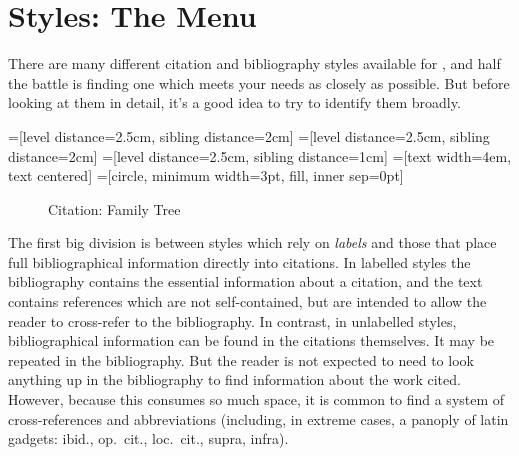 \chapter{Styles: The Menu}\label{ch:bibstyles}

There are many different citation and bibliography styles available
for \biblatex, and half the battle is finding one which meets your
needs as closely as possible. But before looking at them in detail,
it's a good idea to try to identify them broadly.

=[level distance=2.5cm, sibling distance=2cm]
=[level distance=2.5cm, sibling distance=2cm]
=[level distance=2.5cm, sibling distance=1cm]
=[text width=4em, text centered]
=[circle, minimum width=3pt, fill, inner sep=0pt]

\begin{figure}
\sffamily
{}
\caption{Citation: Family Tree}
\end{figure}

The first big division is between styles which rely on \emph{labels}
and those that place full bibliographical information directly into
citations. In labelled styles the bibliography contains the essential
information about a citation, and the text contains references which
are not self-contained, but are intended to allow the reader to
cross-refer to the bibliography. In contrast, in unlabelled styles,
bibliographical information can be found in the citations
themselves. It may be repeated in the bibliography. But the reader is
not expected to need to look anything up in the bibliography to find
information about the work cited. However, because this consumes so
much space, it is common to find a system of cross-references and
abbreviations (including, in extreme cases, a panoply of latin
gadgets: ibid., op.\ cit., loc.\ cit., supra, infra).

